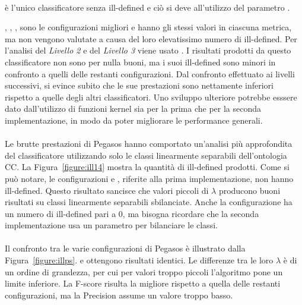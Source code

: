 \paragraph*{}
 è l'unico classificatore senza ill-defined e ciò si deve all'utilizzo del parametro .

, , ,  sono le configurazioni migliori e hanno gli stessi valori in ciascuna metrica, ma non vengono valutate a causa del loro elevatissimo numero di ill-defined. Per l'analisi del \textit{Livello 2} e del \textit{Livello 3} viene usato . I risultati prodotti da questo classificatore non sono per nulla buoni, ma i suoi ill-defined sono minori in confronto a quelli delle restanti configurazioni. Dal confronto effettuato ai livelli successivi, si evince subito che le sue prestazioni sono nettamente inferiori rispetto a quelle degli altri classificatori.
Uno sviluppo ulteriore potrebbe esssere dato dall'utilizzo di funzioni kernel sia per la prima che per la seconda implementazione, in modo da poter migliorare le performance generali.

\paragraph*{}
Le brutte prestazioni di Pegasos hanno comportato un'analisi più approfondita del classificatore utilizzando solo le classi linearmente separabili dell'ontologia CC.
La Figura~\ref{figure:ill14} mostra la quantità di ill-defined prodotti. Come si può notare, le configurazioni  e , riferite alla prima implementazione, non hanno ill-defined. Questo risultato sancisce che valori piccoli di $\lambda$ producono buoni risultati su classi linearmente separabili sbilanciate. Anche la configurazione  ha un numero di ill-defined pari a 0, ma bisogna ricordare che la seconda implementazione usa un parametro per bilanciare le classi.

\paragraph*{}
Il confronto tra le varie configurazioni di Pegasos è illustrato dalla Figura~\ref{figure:illps}.  e  ottengono risultati identici. Le differenze tra le loro $\lambda$ è di un ordine di grandezza, per cui per valori troppo piccoli l'algoritmo pone un limite inferiore. La F-score risulta la migliore rispetto a quella delle restanti configurazioni, ma la Precision assume un valore troppo basso.

